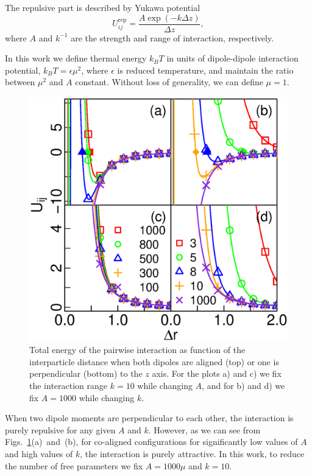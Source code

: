 The repulsive part is described by Yukawa potential
\begin{equation}
\label{eq:yukawa_interaction}
U_{ij}^\mathrm{rep} = \frac{A \exp(-k \Delta z)}{\Delta z},
\end{equation}
where $A$ and $k^{-1}$ are the strength and range of interaction, respectively. 

In this work we define thermal energy $k_BT$ in units of dipole-dipole interaction potential, $k_BT = \epsilon \mu^2$, where $\epsilon$ is reduced temperature, and maintain the ratio between $\mu^2$ and $A$ constant. Without loss of generality, we can define $\mu = 1$.
\begin{figure}[t]
\centering
	\includegraphics[width=0.9\columnwidth]{Images/particle_interaction_potential}
\caption{Total energy of the pairwise interaction as function of the interparticle distance when both dipoles are aligned (top) or one is perpendicular (bottom) to the $z$ axis. For the plots a) and c) we fix the interaction range $k = 10$ while changing $A$, and for b) and d) we fix $A = 1000$ while changing $k$.}
\label{fig:interaction_energy}
\end{figure}
When two dipole moments are perpendicular to each other, the interaction is purely repulsive for any given $A$ and $k$. However, as we can see from Figs.~\ref{fig:interaction_energy}(a)~and~(b), for co-aligned configurations for significantly low values of $A$ and high values of $k$, the interaction is purely attractive. In this work, to reduce the number of free parameters we fix $A = 1000 \mu$ and $k = 10$.
